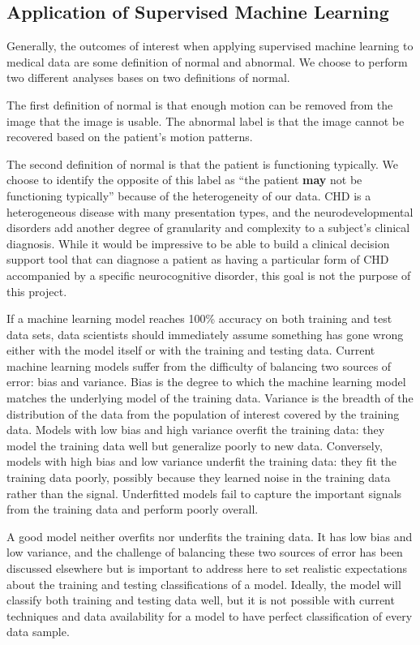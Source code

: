 \subsection{Application of Supervised Machine Learning}

Generally, the outcomes of interest when applying supervised machine learning to medical data are some definition of normal and abnormal. We choose to perform two different analyses bases on two definitions of normal. 

The first definition of normal is that enough motion can be removed from the image that the image is usable. The abnormal label is that the image cannot be recovered based on the patient's motion patterns.

The second definition of normal is that the patient is functioning typically. We choose to identify the opposite of this label as ``the patient \textbf{may} not be functioning typically'' because of the heterogeneity of our data. CHD is a heterogeneous disease with many presentation types, and the neurodevelopmental disorders add another degree of granularity and complexity to a subject's clinical diagnosis. While it would be impressive to be able to build a clinical decision support tool that can diagnose a patient as having a particular form of CHD accompanied by a specific neurocognitive disorder, this goal is not the purpose of this project.

If a machine learning model reaches 100\% accuracy on both training and test data sets, data scientists should immediately assume something has gone wrong either with the model itself or with the training and testing data. Current machine learning models suffer from the difficulty of balancing two sources of error: bias and variance. Bias is the degree to which the machine learning model matches the underlying model of the training data. Variance is the breadth of the distribution of the data from the population of interest covered by the training data. Models with low bias and high variance overfit the training data: they model the training data well but generalize poorly to new data. Conversely, models with high bias and low variance underfit the training data: they fit the training data poorly, possibly because they learned noise in the training data rather than the signal. Underfitted models fail to capture the important signals from the training data and perform poorly overall.

A good model neither overfits nor underfits the training data. It has low bias and low variance, and the challenge of balancing these two sources of error has been discussed elsewhere but is important to address here to set realistic expectations about the training and testing classifications of a model. Ideally, the model will classify both training and testing data well, but it is not possible with current techniques and data availability for a model to have perfect classification of every data sample. 


